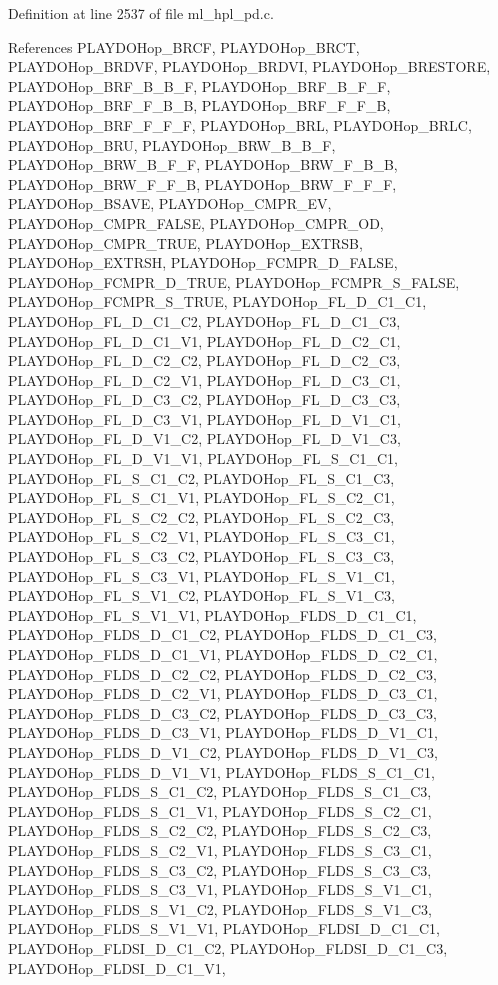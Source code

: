 Definition at line 2537 of file ml\_\-hpl\_\-pd.c.

References PLAYDOHop\_\-BRCF, PLAYDOHop\_\-BRCT, PLAYDOHop\_\-BRDVF, PLAYDOHop\_\-BRDVI, PLAYDOHop\_\-BRESTORE, PLAYDOHop\_\-BRF\_\-B\_\-B\_\-F, PLAYDOHop\_\-BRF\_\-B\_\-F\_\-F, PLAYDOHop\_\-BRF\_\-F\_\-B\_\-B, PLAYDOHop\_\-BRF\_\-F\_\-F\_\-B, PLAYDOHop\_\-BRF\_\-F\_\-F\_\-F, PLAYDOHop\_\-BRL, PLAYDOHop\_\-BRLC, PLAYDOHop\_\-BRU, PLAYDOHop\_\-BRW\_\-B\_\-B\_\-F, PLAYDOHop\_\-BRW\_\-B\_\-F\_\-F, PLAYDOHop\_\-BRW\_\-F\_\-B\_\-B, PLAYDOHop\_\-BRW\_\-F\_\-F\_\-B, PLAYDOHop\_\-BRW\_\-F\_\-F\_\-F, PLAYDOHop\_\-BSAVE, PLAYDOHop\_\-CMPR\_\-EV, PLAYDOHop\_\-CMPR\_\-FALSE, PLAYDOHop\_\-CMPR\_\-OD, PLAYDOHop\_\-CMPR\_\-TRUE, PLAYDOHop\_\-EXTRSB, PLAYDOHop\_\-EXTRSH, PLAYDOHop\_\-FCMPR\_\-D\_\-FALSE, PLAYDOHop\_\-FCMPR\_\-D\_\-TRUE, PLAYDOHop\_\-FCMPR\_\-S\_\-FALSE, PLAYDOHop\_\-FCMPR\_\-S\_\-TRUE, PLAYDOHop\_\-FL\_\-D\_\-C1\_\-C1, PLAYDOHop\_\-FL\_\-D\_\-C1\_\-C2, PLAYDOHop\_\-FL\_\-D\_\-C1\_\-C3, PLAYDOHop\_\-FL\_\-D\_\-C1\_\-V1, PLAYDOHop\_\-FL\_\-D\_\-C2\_\-C1, PLAYDOHop\_\-FL\_\-D\_\-C2\_\-C2, PLAYDOHop\_\-FL\_\-D\_\-C2\_\-C3, PLAYDOHop\_\-FL\_\-D\_\-C2\_\-V1, PLAYDOHop\_\-FL\_\-D\_\-C3\_\-C1, PLAYDOHop\_\-FL\_\-D\_\-C3\_\-C2, PLAYDOHop\_\-FL\_\-D\_\-C3\_\-C3, PLAYDOHop\_\-FL\_\-D\_\-C3\_\-V1, PLAYDOHop\_\-FL\_\-D\_\-V1\_\-C1, PLAYDOHop\_\-FL\_\-D\_\-V1\_\-C2, PLAYDOHop\_\-FL\_\-D\_\-V1\_\-C3, PLAYDOHop\_\-FL\_\-D\_\-V1\_\-V1, PLAYDOHop\_\-FL\_\-S\_\-C1\_\-C1, PLAYDOHop\_\-FL\_\-S\_\-C1\_\-C2, PLAYDOHop\_\-FL\_\-S\_\-C1\_\-C3, PLAYDOHop\_\-FL\_\-S\_\-C1\_\-V1, PLAYDOHop\_\-FL\_\-S\_\-C2\_\-C1, PLAYDOHop\_\-FL\_\-S\_\-C2\_\-C2, PLAYDOHop\_\-FL\_\-S\_\-C2\_\-C3, PLAYDOHop\_\-FL\_\-S\_\-C2\_\-V1, PLAYDOHop\_\-FL\_\-S\_\-C3\_\-C1, PLAYDOHop\_\-FL\_\-S\_\-C3\_\-C2, PLAYDOHop\_\-FL\_\-S\_\-C3\_\-C3, PLAYDOHop\_\-FL\_\-S\_\-C3\_\-V1, PLAYDOHop\_\-FL\_\-S\_\-V1\_\-C1, PLAYDOHop\_\-FL\_\-S\_\-V1\_\-C2, PLAYDOHop\_\-FL\_\-S\_\-V1\_\-C3, PLAYDOHop\_\-FL\_\-S\_\-V1\_\-V1, PLAYDOHop\_\-FLDS\_\-D\_\-C1\_\-C1, PLAYDOHop\_\-FLDS\_\-D\_\-C1\_\-C2, PLAYDOHop\_\-FLDS\_\-D\_\-C1\_\-C3, PLAYDOHop\_\-FLDS\_\-D\_\-C1\_\-V1, PLAYDOHop\_\-FLDS\_\-D\_\-C2\_\-C1, PLAYDOHop\_\-FLDS\_\-D\_\-C2\_\-C2, PLAYDOHop\_\-FLDS\_\-D\_\-C2\_\-C3, PLAYDOHop\_\-FLDS\_\-D\_\-C2\_\-V1, PLAYDOHop\_\-FLDS\_\-D\_\-C3\_\-C1, PLAYDOHop\_\-FLDS\_\-D\_\-C3\_\-C2, PLAYDOHop\_\-FLDS\_\-D\_\-C3\_\-C3, PLAYDOHop\_\-FLDS\_\-D\_\-C3\_\-V1, PLAYDOHop\_\-FLDS\_\-D\_\-V1\_\-C1, PLAYDOHop\_\-FLDS\_\-D\_\-V1\_\-C2, PLAYDOHop\_\-FLDS\_\-D\_\-V1\_\-C3, PLAYDOHop\_\-FLDS\_\-D\_\-V1\_\-V1, PLAYDOHop\_\-FLDS\_\-S\_\-C1\_\-C1, PLAYDOHop\_\-FLDS\_\-S\_\-C1\_\-C2, PLAYDOHop\_\-FLDS\_\-S\_\-C1\_\-C3, PLAYDOHop\_\-FLDS\_\-S\_\-C1\_\-V1, PLAYDOHop\_\-FLDS\_\-S\_\-C2\_\-C1, PLAYDOHop\_\-FLDS\_\-S\_\-C2\_\-C2, PLAYDOHop\_\-FLDS\_\-S\_\-C2\_\-C3, PLAYDOHop\_\-FLDS\_\-S\_\-C2\_\-V1, PLAYDOHop\_\-FLDS\_\-S\_\-C3\_\-C1, PLAYDOHop\_\-FLDS\_\-S\_\-C3\_\-C2, PLAYDOHop\_\-FLDS\_\-S\_\-C3\_\-C3, PLAYDOHop\_\-FLDS\_\-S\_\-C3\_\-V1, PLAYDOHop\_\-FLDS\_\-S\_\-V1\_\-C1, PLAYDOHop\_\-FLDS\_\-S\_\-V1\_\-C2, PLAYDOHop\_\-FLDS\_\-S\_\-V1\_\-C3, PLAYDOHop\_\-FLDS\_\-S\_\-V1\_\-V1, PLAYDOHop\_\-FLDSI\_\-D\_\-C1\_\-C1, PLAYDOHop\_\-FLDSI\_\-D\_\-C1\_\-C2, PLAYDOHop\_\-FLDSI\_\-D\_\-C1\_\-C3, PLAYDOHop\_\-FLDSI\_\-D\_\-C1\_\-V1, 